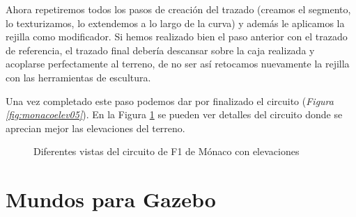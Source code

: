 Ahora repetiremos todos los pasos de creación del trazado (creamos el segmento, lo texturizamos, lo extendemos a lo largo de la curva) y además le aplicamos la rejilla como modificador. Si hemos realizado bien el paso anterior con el trazado de referencia, el trazado final debería descansar sobre la caja realizada y acoplarse perfectamente al terreno, de no ser así retocamos nuevamente la rejilla con las herramientas de escultura. 

Una vez completado este paso podemos dar por finalizado el circuito (\textit{Figura \ref{fig:monacoelev05}}). En la Figura \ref{fig:monacoelevvistas} se pueden ver detalles del circuito donde se aprecian mejor las elevaciones del terreno.

\begin{figure}[h]
	\centering
	\hspace{0.04\textwidth}	
	\vspace{0.03\textwidth}
	\hspace{0.04\textwidth}
	\caption{Diferentes vistas del circuito de F1 de Mónaco con elevaciones} \label{fig:monacoelevvistas}
\end{figure}



\section{Mundos para Gazebo}
\label{sec:pm_mundosparagazebo}




